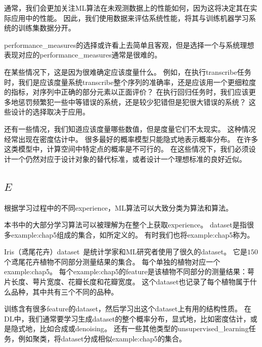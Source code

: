 
通常，我们会更加关注\gls{ML}算法在未观测数据上的性能如何，因为这将决定其在实际应用中的性能。
因此，我们使用数据来评估系统性能，将其与训练机器学习系统的训练集数据分开。


\gls{performance_measures}的选择或许看上去简单且客观，但是选择一个与系统理想表现对应的\gls{performance_measures}通常是很难的。


在某些情况下，这是因为很难确定应该度量什么。
例如，在执行\gls{transcribe}任务时，我们是应该度量系统\gls{transcribe}整个序列的准确率，还是应该用一个更细粒度的指标，对序列中正确的部分元素以正面评价？
在执行回归任务时，我们应该更多地惩罚频繁犯一些中等错误的系统，还是较少犯错但是犯很大错误的系统？
这些设计的选择取决于应用。


还有一些情况，我们知道应该度量哪些数值，但是度量它们不太现实。
这种情况经常出现在密度估计中。
很多最好的概率模型只能隐式地表示概率分布。
在许多这类模型中，计算空间中特定点的概率是不可行的。
在这些情况下，我们必须设计一个仍然对应于设计对象的替代标准，或者设计一个理想标准的良好近似。

\subsection{ $E$}
\label{sec:the_experience_e}
根据学习过程中的不同\gls{experience}，\gls{ML}算法可以大致分类为算法和算法。

本书中的大部分学习算法可以被理解为在整个上获取\gls{experience}。
\gls{dataset}是指很多\gls{example:chap5}组成的集合，如所定义的。
有时我们也将\gls{example:chap5}称为。


Iris（鸢尾花卉）\gls{dataset}~\citep{Fisher-1936}是统计学家和\gls{ML}研究者使用了很久的\gls{dataset}。
它是$150$个鸢尾花卉植物不同部分测量结果的集合。
每个单独的植物对应一个\gls{example:chap5}。
每个\gls{example:chap5}的\gls{feature}是该植物不同部分的测量结果：萼片长度、萼片宽度、花瓣长度和花瓣宽度。
这个\gls{dataset}也记录了每个植物属于什么品种，其中共有三个不同的品种。

训练含有很多\gls{feature}的\gls{dataset}，然后学习出这个\gls{dataset}上有用的结构性质。
在\gls{DL}中，我们通常要学习生成\gls{dataset}的整个概率分布，显式地，比如密度估计，或是隐式地，比如合成或\gls{denoising}。
还有一些其他类型的\gls{unsupervised_learning}任务，例如聚类，将\gls{dataset}分成相似\gls{example:chap5}的集合。

